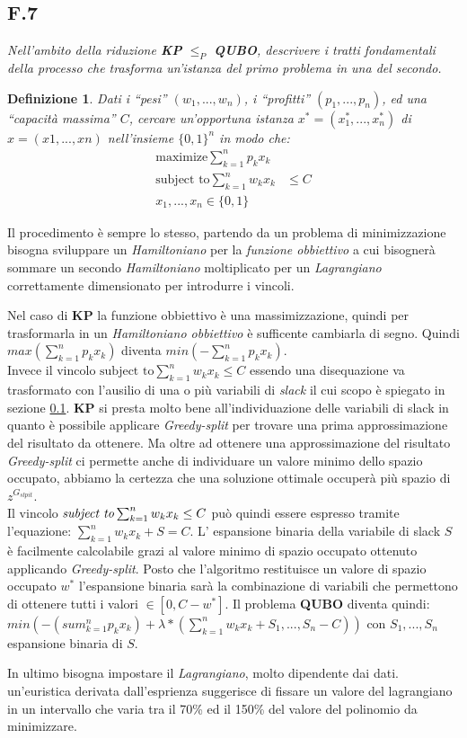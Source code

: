 \documentclass[a4paper]{article}
\newtheorem*{definition}{Definizione}
\begin{document}
\subsection{F.7}
\label{SEC:F6}
\emph{Nell’ambito della riduzione \textbf{KP} $\leq_P$ \textbf{QUBO}, descrivere i tratti fondamentali della processo che trasforma un’istanza del primo problema in una del secondo.}
\begin{definition} 
	Dati i “pesi” $(w_1, . . . , w_n)$, i “profitti” $(p_1, . . . , p_n)$, ed una “capacità massima” $C$, cercare un’opportuna istanza $x^* = (x^*_1, . . . , x^*_n)$ di $x = (x1, . . . , xn)$ nell’insieme  $\{0, 1\}^n$ in modo che:
\begin{align*}
        \text{maximize} \sum_{k=1}^n p_kx_k&\\
	\text{subject to} \sum_{k=1}^n w_kx_k&\leq C\\
x_1,...,x_n \in \{0,1\}&
\end{align*}
\end{definition}
Il procedimento è sempre lo stesso, partendo da un problema di minimizzazione bisogna sviluppare un \textit{Hamiltoniano} per la \textit{funzione obbiettivo} a cui bisognerà sommare un secondo \textit{Hamiltoniano} moltiplicato per un \textit{Lagrangiano} correttamente dimensionato per introdurre i vincoli.

Nel caso di \textbf{KP} la funzione obbiettivo è una massimizzazione, quindi per trasformarla in un \textit{Hamiltoniano obbiettivo} è sufficente cambiarla di segno.
Quindi $max(\sum_{k=1}^{n} p_kx_k )$ diventa $min(-\sum_{k=1}^{n} p_kx_k )$.\\
Invece il vincolo $\text{subject to} \sum_{k=1}^n w_kx_k \leq C$ essendo una disequazione va trasformato con l'ausilio di una o più variabili di \textit{slack} il cui scopo è spiegato in sezione \ref{SEC:F6}.
\textbf{KP} si presta molto bene all'individuazione delle variabili di slack in quanto è possibile applicare \textit{Greedy-split} per trovare una prima approssimazione del risultato da ottenere.
Ma oltre ad ottenere una approssimazione del risultato \textit{Greedy-split} ci permette anche di individuare un valore minimo dello spazio occupato, abbiamo la certezza che una soluzione ottimale occuperà più spazio di $z^{G_{slpit}}$.\\
Il vincolo $\text{\textit{subject to}} \sum_{k=1}^n w_kx_k \leq C$ può quindi essere espresso tramite l'equazione: $\sum_{k=1}^n w_kx_k + S=C$.
L' espansione binaria della variabile di slack $S$ è facilmente calcolabile grazi al valore minimo di spazio occupato ottenuto applicando \textit{Greedy-split}.
Posto che l'algoritmo restituisce un valore di spazio occupato $w^*$ l'espansione binaria sarà la combinazione di variabili che permettono di ottenere tutti i valori $\in [0,C-w^*]$.
Il problema \textbf{QUBO} diventa quindi: $ min(-(sum_{k=1}^n p_kx_k) + \lambda * (\sum_{k=1}^n w_kx_k + S_1,...,S_n - C)) $ con $S_1, ..., S_n$ espansione binaria di $S$.

In ultimo bisogna impostare il \textit{Lagrangiano}, molto dipendente dai dati. un'euristica derivata dall'esprienza suggerisce di fissare un valore del lagrangiano in un intervallo che varia tra il 70\% ed il 150\% del valore del polinomio da minimizzare.
\end{document}
